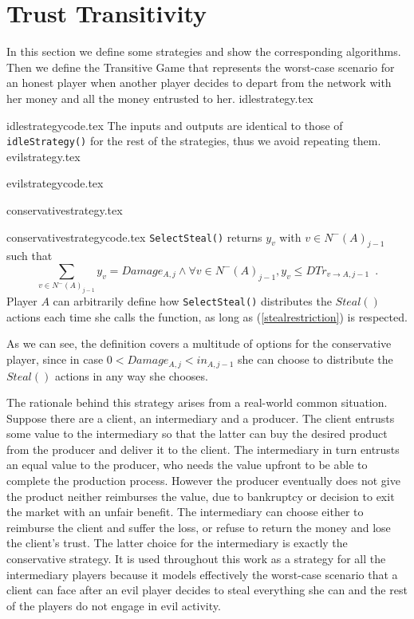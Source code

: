 \section{Trust Transitivity}
   In this section we define some strategies and show the corresponding algorithms. Then we define the
   Transitive Game that represents the worst-case scenario for an honest player when another player decides to depart from
   the network with her money and all the money entrusted to her.
   {idlestrategy.tex}

   {idlestrategycode.tex}
   The inputs and outputs are identical to those of \texttt{idleStrategy()} for the rest of the strategies, thus we avoid
   repeating them.
   {evilstrategy.tex}

   {evilstrategycode.tex}

   {conservativestrategy.tex}

   {conservativestrategycode.tex}
   \texttt{SelectSteal()} returns $y_v$ with $v \in N^{-}\left(A\right)_{j-1}$ such that
   \begin{equation}
   \label{stealrestriction}
      \sum\limits_{v \in N^{-}\left(A\right)_{j-1}}y_v = Damage_{A, j} \wedge \forall v \in N^{-}\left(A\right)_{j-1},
      y_v \leq DTr_{v \rightarrow A, j-1} \enspace.
   \end{equation}
   Player $A$ can arbitrarily define how \texttt{SelectSteal()} distributes the $Steal\left(\right)$ actions
   each time she calls the function, as long as (\ref{stealrestriction}) is respected. 

   As we can see, the definition covers a multitude of options for the conservative player, since in case $0 < Damage_{A,j}
   < in_{A,j-1}$ she can choose to distribute the $Steal\left(\right)$ actions in any way she chooses.

   The rationale behind this strategy arises from a real-world common situation. Suppose there are a client, an
   intermediary and a producer. The client entrusts some value to the intermediary so that the latter can buy the desired
   product from the producer and deliver it to the client. The intermediary in turn entrusts an equal value to the
   producer, who needs the value upfront to be able to complete the production process. However the producer eventually
   does not give the product neither reimburses the value, due to bankruptcy or decision to exit the market with an unfair
   benefit. The intermediary can choose either to reimburse the client and suffer the loss, or refuse to return the money
   and lose the client's trust. The latter choice for the intermediary is exactly the conservative strategy. It is used
   throughout this work as a strategy for all the intermediary players because it models effectively the worst-case
   scenario that a client can face after an evil player decides to steal everything she can and the rest of the players do
   not engage in evil activity.

